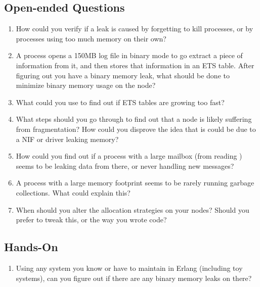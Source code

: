 \documentclass[11pt, oneside]{book}   	%
\begin{document}
\subsection*{Open-ended Questions}

\begin{enumerate}
	\item  How could you verify if a leak is caused by forgetting to kill processes, or by processes using too much memory on their own?
	\item A process opens a 150MB log file in binary mode to go extract a piece of information from it, and then stores that information in an ETS table. After figuring out you have a binary memory leak, what should be done to minimize binary memory usage on the node?
	\item What could you use to find out if ETS tables are growing too fast?
	\item What steps should you go through to find out that a node is likely suffering from fragmentation? How could you disprove the idea that is could be due to a NIF or driver leaking memory?
	\item How could you find out if a process with a large mailbox (from reading ) seems to be leaking data from there, or never handling new messages?
	\item A process with a large memory footprint seems to be rarely running garbage collections. What could explain this?
	\item When should you alter the allocation strategies on your nodes? Should you prefer to tweak this, or the way you wrote code?
\end{enumerate}

\subsection*{Hands-On}

\begin{enumerate}
	\item Using any system you know or have to maintain in Erlang (including toy systems), can you figure out if there are any binary memory leaks on there?
\end{enumerate}
	
\end{document}
